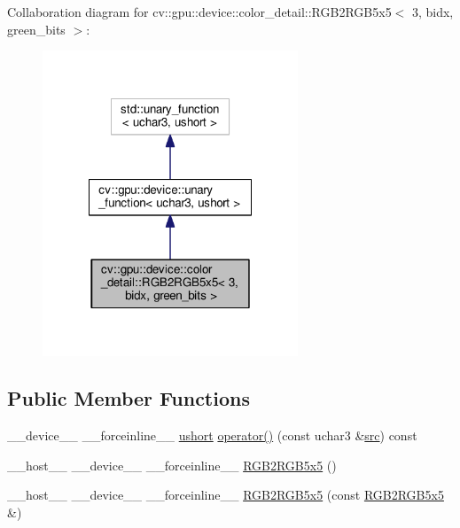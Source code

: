 Collaboration diagram for cv\-:\-:gpu\-:\-:device\-:\-:color\-\_\-detail\-:\-:R\-G\-B2\-R\-G\-B5x5$<$ 3, bidx, green\-\_\-bits $>$\-:\nopagebreak
\begin{figure}[H]
\begin{center}
\leavevmode
\includegraphics[width=216pt]{structcv_1_1gpu_1_1device_1_1color__detail_1_1RGB2RGB5x5_3_013_00_01bidx_00_01green__bits_01_4__coll__graph}
\end{center}
\end{figure}
\subsection*{Public Member Functions}
\begin{DoxyCompactItemize}
\item 
\-\_\-\-\_\-device\-\_\-\-\_\- \-\_\-\-\_\-forceinline\-\_\-\-\_\- \hyperlink{core_2types__c_8h_ab95f123a6c9bcfee6a343170ef8c5f69}{ushort} \hyperlink{structcv_1_1gpu_1_1device_1_1color__detail_1_1RGB2RGB5x5_3_013_00_01bidx_00_01green__bits_01_4_a5a0f324e8e2c5ada2e72c8b8e0a8b6fb}{operator()} (const uchar3 \&\hyperlink{legacy_8hpp_a371cd109b74033bc4366f584edd3dacc}{src}) const 
\item 
\-\_\-\-\_\-host\-\_\-\-\_\- \-\_\-\-\_\-device\-\_\-\-\_\- \-\_\-\-\_\-forceinline\-\_\-\-\_\- \hyperlink{structcv_1_1gpu_1_1device_1_1color__detail_1_1RGB2RGB5x5_3_013_00_01bidx_00_01green__bits_01_4_a973603ad6706188d8235ac1d13ee8449}{R\-G\-B2\-R\-G\-B5x5} ()
\item 
\-\_\-\-\_\-host\-\_\-\-\_\- \-\_\-\-\_\-device\-\_\-\-\_\- \-\_\-\-\_\-forceinline\-\_\-\-\_\- \hyperlink{structcv_1_1gpu_1_1device_1_1color__detail_1_1RGB2RGB5x5_3_013_00_01bidx_00_01green__bits_01_4_a02afb14b9a6628699fbbd691e290f2a9}{R\-G\-B2\-R\-G\-B5x5} (const \hyperlink{structcv_1_1gpu_1_1device_1_1color__detail_1_1RGB2RGB5x5}{R\-G\-B2\-R\-G\-B5x5} \&)
\end{DoxyCompactItemize}


